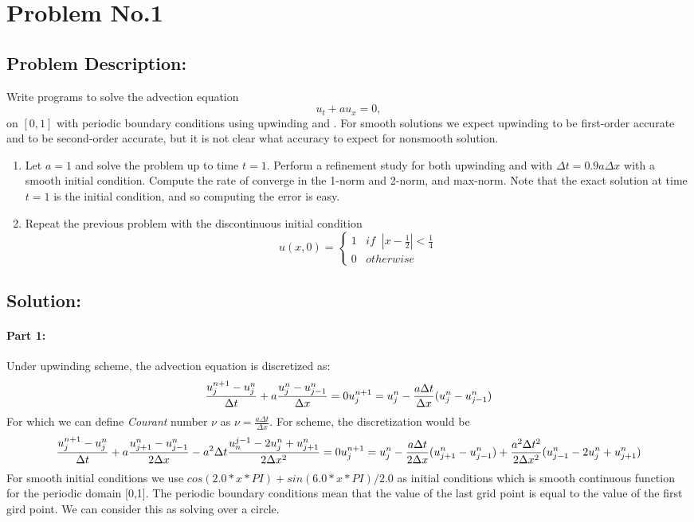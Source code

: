 \section{Problem No.1} \label{sec:prob2}
\subsection{Problem Description:} 
Write programs to solve the advection equation 
$$
u_{t} + au_{x}=0,
$$
on $[0,1]$ with periodic boundary conditions using upwinding and \protect{\lw}. For smooth solutions we expect upwinding to be first-order accurate and \protect{\lw} to be second-order accurate, but it is not clear what accuracy to expect for nonsmooth solution.  
\begin{enumerate}
\item Let $a=1$ and solve the problem up to time $t=1$. Perform a refinement study for both upwinding and \protect{\lw} with $\Delta t=0.9a\Delta x$ with a smooth initial condition. Compute the rate of converge in the 1-norm and 2-norm, and max-norm. Note that the exact solution at time $t=1$ is the initial condition, and so computing the error is easy. 
\item Repeat the previous problem with the discontinuous initial condition 
$$
u(x,0) = \begin{cases}
         1\;\;\; if \;\;|x-\frac{1}{2}|<\frac{1}{4}\\
         0\;\;\; otherwise
         \end{cases}
$$
\end{enumerate}


\subsection{Solution:} 
\paragraph{Part 1:}
Under upwinding scheme, the advection equation is discretized as:
$$
\frac{u_{j}^{n+1}-u_{j}^{n}}{\Delta t} + a\frac{u_{j}^{n}-u_{j-1}^{n}}{\Delta x}=0\\
u_{j}^{n+1} = u_{j}^{n} - \frac{a\Delta t}{\Delta x}(u_{j}^{n}-u_{j-1}^{n})
$$
For which we can define \emph{Courant} number $\nu$ as $\nu = \frac{a\Delta t}{\Delta x}$.  For \protect{\lw}  scheme, the discretization would be
$$
\frac{u_{j}^{n+1}-u_{j}^{n}}{\Delta t} + a \frac{u_{j+1}^{n} -u_{j-1}^{n}}{2\Delta x} - a^2\Delta t \frac{u_{n}^{j-1}-2u_{j}^{n}+u_{j+1}^{n}}{2 \Delta x^2}=0\\
u_{j}^{n+1} = u_{j}^{n} - \frac{a \Delta t}{2\Delta x}(u_{j+1}^{n}-u_{j-1}^{n})+\frac{a^2\Delta t^2}{2\Delta x^2}(u_{j-1}^{n}-2u_{j}^{n}+u_{j+1}^{n})
$$
For smooth initial conditions we use $cos(2.0*x*PI) + sin(6.0*x*PI) / 2.0$ as initial conditions which is smooth continuous function for the periodic domain [0,1]. The periodic boundary conditions mean that the value of the last grid point is equal to the value of the first gird point. We can consider this as solving over a circle. 


